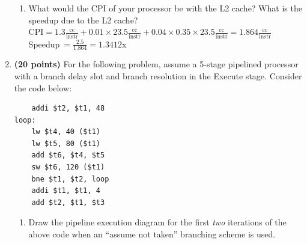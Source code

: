 \documentclass[11pt]{article}
\begin{document}
\begin{enumerate}
\begin{enumerate}
        \item What would the CPI of your processor be with the L2 cache? What is the speedup due to the L2 cache?\\[1em]
        $\mathrm{CPI=1.3\frac{cc}{instr}+0.01\times 23.5\frac{cc}{instr}+0.04\times 0.35\times 23.5\frac{cc}{instr}=1.864\frac{cc}{instr}}$\\[0.25em]
        Speedup$\ =\frac{2.5}{1.864}=1.3412$x\\
    \end{enumerate}
\newpage
    \item \textbf{(20 points)} For the following problem, assume a 5-stage pipelined processor with a branch delay slot and branch resolution in the Execute stage. Consider the code below:
\begin{verbatim}
    addi $t2, $t1, 48
loop:
    lw $t4, 40 ($t1)
    lw $t5, 80 ($t1)
    add $t6, $t4, $t5
    sw $t6, 120 ($t1)
    bne $t1, $t2, loop
    addi $t1, $t1, 4
    add $t2, $t1, $t3
\end{verbatim}
    \begin{enumerate}
        \item Draw the pipeline execution diagram for the first \textit{two} iterations of the above code when an “assume not taken” branching scheme is used.
\begin{table}[ht]
\centering
{}
\end{table}
\end{enumerate}
\end{enumerate}
\end{document}
